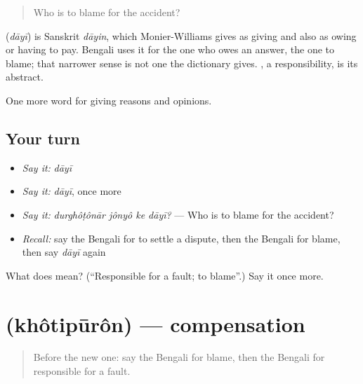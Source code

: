 \begin{quote}
Who is to blame for the accident?
\end{quote}

\begin{cousinweb}
\textbf{} (\emph{dāyī}) is Sanskrit \emph{dāyin}, which Monier-Williams gives as giving and also as owing or having to pay. Bengali uses it for the one who owes an answer, the one to blame; that narrower sense is not one the dictionary gives. , a responsibility, is its abstract.
\end{cousinweb}

\begin{grammarlens}[title={What you've built}]
One more word for giving reasons and opinions.
\end{grammarlens}

\subsection*{Your turn}
\begin{itemize}
\raggedright
  \item \emph{Say it:} \emph{dāyī}
  \item \emph{Say it:} \emph{dāyī}, once more
  \item \emph{Say it:} \emph{durghôṭônār jônyô ke dāyī?} — Who is to blame for the accident?
  \item \emph{Recall:} say the Bengali for to settle a dispute, then the Bengali for blame, then say \emph{dāyī} again
\end{itemize}

\begin{tcolorbox}[breakable,colback=teal!4,colframe=teal!35!black,title={Before you move on}]
What does  mean? (\textquotedblleft{}Responsible for a fault; to blame\textquotedblright{}.) Say it once more.
\end{tcolorbox}
\section[\texorpdfstring{\bn{ক্ষতিপূরণ} (khôtipūrôn)}{ক্ষতিপূরণ (khôtipūrôn)}]{ (khôtipūrôn) — compensation}

\label{lesson:BN-C343-khotipuron}



\begin{quote}
Before the new one: say the Bengali for blame, then the Bengali for responsible for a fault.
\end{quote}

